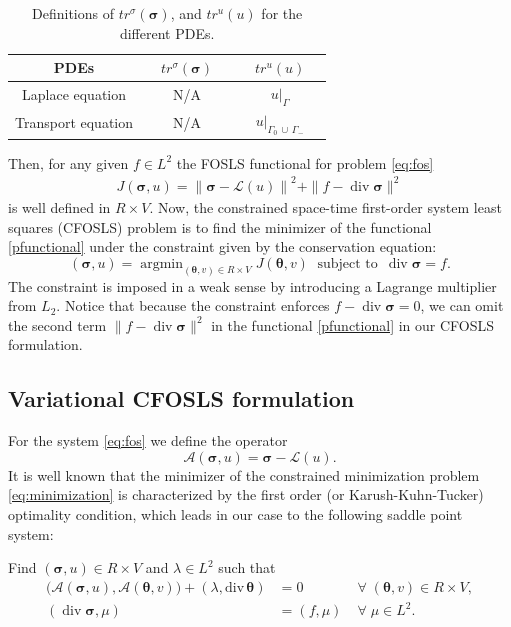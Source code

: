 \documentclass[a4paper,12pt]{amsart}
\numberwithin{equation}{section}
\renewcommand{\div}{\operatorname{div}}
\newcommand{\A}{{\mathcal A}}
\renewcommand{\L}{{\mathcal L}}
\def\btheta{{\boldsymbol \theta}}
\def\bsigma{{\boldsymbol \sigma}}
\newcommand{\om}{\Omega}
\DeclareMathOperator*{\argmin}{argmin}
\begin{document}
\begin{table}[h]
\caption{Definitions of $tr^{\sigma}(\bsigma)$, and $tr^u(u)$ for the different PDEs.}
\label{tab:FOSLS_operators}
\begin{tabular}{ |c||c|c|} \hline
PDEs & $\quad tr^{\sigma}(\bsigma) \quad$ & $\quad tr^u(u) \quad$  \\ \hline
Laplace equation & N/A & $u|_\Gamma$ \\ \hline
Transport equation & N/A & $u|_{\Gamma_0\,\cup\,\Gamma_-}$ \\ \hline
\end{tabular}
\end{table}

Then, for any given $f\in L^2$ the FOSLS functional for problem \eqref{eq:fos} 
\begin{align}
J(\bsigma, u) = \left\| \bsigma - \L(u) \right\|^2 + \| f-\div \bsigma \| ^2 \label{pfunctional}
\end{align} 
is well defined in $R \times V$.
Now, the constrained space-time first-order system least squares (CFOSLS) problem is to find the minimizer of the functional \eqref{pfunctional} 
under the constraint given by the conservation equation:
\begin{equation}
(\bsigma, u) = \argmin_{(\btheta, v)\in R\times V} J(\btheta, v) \;\text{ subject to } \, \div \bsigma = f. 
\label{eq:minimization}
\end{equation}
The constraint is imposed in a weak sense by introducing a Lagrange multiplier from $L_2$. Notice that because the constraint enforces $f-\div \bsigma = 0$, we can omit the second term $\| f-\div \bsigma \| ^2$ in the functional \eqref{pfunctional} in our CFOSLS formulation.


\subsection{Variational CFOSLS formulation} 
For the system \eqref{eq:fos} we define the operator
\[ 
\A(\bsigma, u ) = \bsigma -\L(u).
\]
It is well known that the minimizer of the constrained minimization problem \eqref{eq:minimization} is characterized by the first order (or Karush-Kuhn-Tucker) optimality condition, which leads in our case to the following saddle point system: 

Find $(\bsigma, u) \in R\times V$ and $\lambda \in L^2$ such that 
\begin{equation}
\begin{array}{lll}
\big(\A(\bsigma, u), \A(\btheta, v) \big) + (\lambda, \mathrm{div}\,  \btheta) & = 0  & \;\forall\; (\btheta, v) \in R\times V,     \\
( \div  \bsigma,\mu )  &= (f, \mu) &  \;\forall\;  \mu\in L^2.
\end{array}
\label{eq:kkt_system}
\end{equation} 
\end{document}
